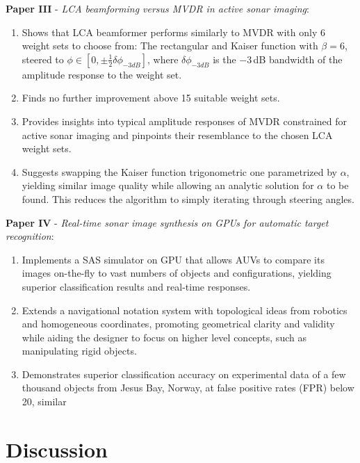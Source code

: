 \textbf{Paper III} - \textit{LCA beamforming versus MVDR in active sonar imaging}:
\begin{enumerate}
\item Shows that LCA beamformer performs similarly to MVDR with only 6 weight sets to choose from: The rectangular and Kaiser function with $\beta=6$, steered to $\phi\in[0,\pm\frac{1}{2}\delta{\phi_{-3dB}}]$, where $\delta{\phi_{-3dB}}$ is the $-3$\,dB bandwidth of the amplitude response to the weight set.
\item Finds no further improvement above 15 suitable weight sets.
\item Provides insights into typical amplitude responses of MVDR constrained for active sonar imaging and pinpoints their resemblance to the chosen LCA weight sets. 
\item Suggests swapping the Kaiser function trigonometric one parametrized by $\alpha$, yielding similar image quality while allowing an analytic solution for $\alpha$ to be found. This reduces the algorithm to simply iterating through steering angles.
\end{enumerate}

\textbf{Paper IV} - \textit{Real-time sonar image synthesis on GPUs for automatic target recognition}:
\begin{enumerate}
\item Implements a SAS simulator on GPU that allows AUVs to compare its images on-the-fly to vast numbers of objects and configurations, yielding superior classification results and real-time responses.
\item Extends a navigational notation system with topological ideas from robotics and homogeneous coordinates, promoting geometrical clarity and validity while aiding the designer to focus on higher level concepts, such as manipulating rigid objects.
\item Demonstrates superior classification accuracy on experimental data of a few thousand objects from Jesus Bay, Norway, at false positive rates (FPR) below 20, similar %
\end{enumerate}

\section{Discussion}

